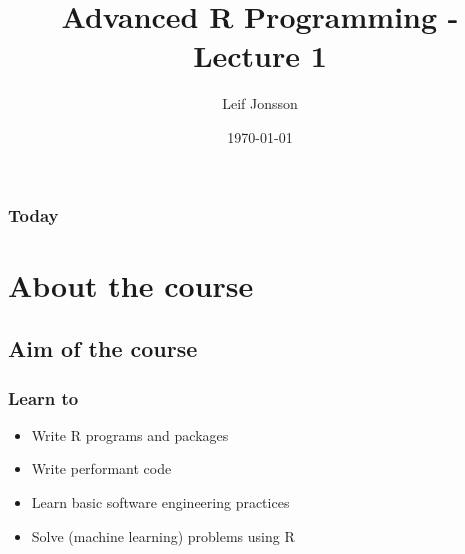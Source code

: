 \documentclass{beamer}
\title[Lecture 1]{Advanced R Programming - Lecture 1} %
\author{Leif Jonsson} %
\institute[STIMA LiU] %
{
Link\"{o}ping University \\ %
\medskip
\textit{leif.jonsson@ericsson.com\\leif.r.jonsson@liu.se} %
}
\date{\today} %
\begin{document}
\begin{frame}
\titlepage %
\end{frame}

\begin{frame}
\frametitle{Today} %
\tableofcontents %
\end{frame}


\section{About the course} %

\subsection{Aim of the course} %

\begin{frame}
\frametitle{Learn to}
\begin{itemize}
\item Write R programs and packages
\item Write performant code
\item Learn basic software engineering practices
\item Solve (machine learning) problems using R
\end{itemize}
\end{frame}
\end{document}
